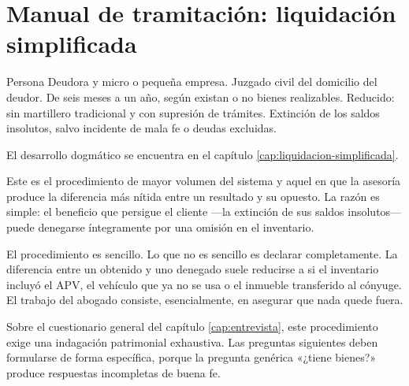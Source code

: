 \chapter{Manual de tramitación: liquidación simplificada}
\label{cap:tram-liq-simplificada}

\fichaProcedimiento
  {Persona Deudora y micro o pequeña empresa.}
  {Juzgado civil del domicilio del deudor.}
  {De seis meses a un año, según existan o no bienes realizables.}
  {Reducido: sin martillero tradicional y con supresión de trámites.}
  {Extinción de los saldos insolutos, salvo incidente de mala fe o deudas excluidas.}

El desarrollo dogmático se encuentra en el capítulo
\ref{cap:liquidacion-simplificada}.

\bloqueEncargo

Este es el procedimiento de mayor volumen del sistema y aquel en que la asesoría produce
la diferencia más nítida entre un resultado y su opuesto. La razón es simple: el
beneficio que persigue el cliente ---la extinción de sus saldos insolutos--- puede
denegarse íntegramente por una omisión en el inventario.

\begin{foco}
El procedimiento es sencillo. Lo que no es sencillo es declarar completamente. La
diferencia entre un \discharge{} obtenido y uno denegado suele reducirse a si el
inventario incluyó el APV, el vehículo que ya no se usa o el inmueble transferido al
cónyuge. El trabajo del abogado consiste, esencialmente, en asegurar que nada quede
fuera.
\end{foco}

\bloqueEntrevista

Sobre el cuestionario general del capítulo \ref{cap:entrevista}, este procedimiento exige
una indagación patrimonial exhaustiva. Las preguntas siguientes deben formularse de forma
específica, porque la pregunta genérica «¿tiene bienes?» produce respuestas incompletas
de buena fe.

